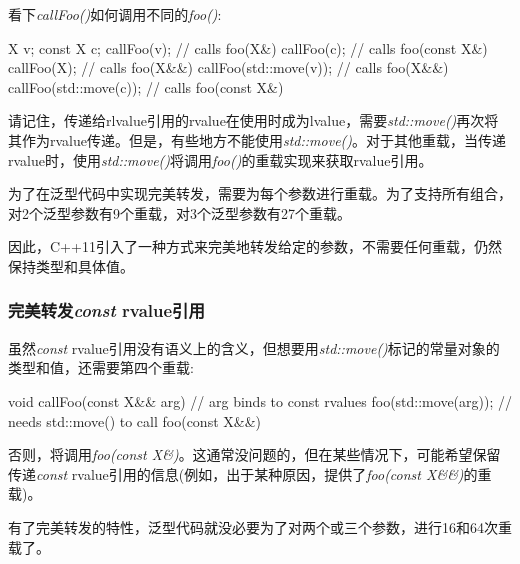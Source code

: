 看下\textit{callFoo()}如何调用不同的\textit{foo()}:

\begin{cppcode}
X v;
const X c;
callFoo(v); // calls foo(X&)
callFoo(c); // calls foo(const X&)
callFoo(X{}); // calls foo(X&&)
callFoo(std::move(v)); // calls foo(X&&)
callFoo(std::move(c)); // calls foo(const X&)
\end{cppcode}

请记住，传递给rlvalue引用的rvalue在使用时成为lvalue，需要\textit{std::move()}再次将其作为rvalue传递。但是，有些地方不能使用\textit{std::move()}。对于其他重载，当传递rvalue时，使用\textit{std::move()}将调用\textit{foo()}的重载实现来获取rvalue引用。

为了在泛型代码中实现完美转发，需要为每个参数进行重载。为了支持所有组合，对2个泛型参数有9个重载，对3个泛型参数有27个重载。

因此，C++11引入了一种方式来完美地转发给定的参数，不需要任何重载，仍然保持类型和具体值。

\subsubsection{完美转发\textit{const} rvalue引用}

虽然\textit{const} rvalue引用没有语义上的含义，但想要用\textit{std::move()}标记的常量对象的类型和值，还需要第四个重载:

\begin{cppcode}
void callFoo(const X&& arg) { // arg binds to const rvalues
	foo(std::move(arg)); // needs std::move() to call foo(const X&&)
}
\end{cppcode}

否则，将调用\textit{foo(const X\&)}。这通常没问题的，但在某些情况下，可能希望保留传递\textit{const} rvalue引用的信息(例如，出于某种原因，提供了\textit{foo(const X\&\&)}的重载)。

有了完美转发的特性，泛型代码就没必要为了对两个或三个参数，进行16和64次重载了。


















